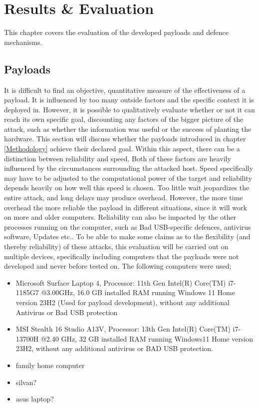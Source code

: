 \chapter{Results \& Evaluation} \label{Evaluation}

This chapter covers the evaluation of the developed payloads and defence mechanisms. 


\section{Payloads}

It is difficult to find an objective, quantitative measure of the effectiveness of a payload. It is influenced by too many outside factors and the specific context it is deployed in. However, it is possible to qualitatively evaluate whether or not it can reach its own specific goal, discounting any factors of the bigger picture of the attack, such as whether the information was useful or the success of planting the hardware. This section will discuss whether the payloads introduced in chapter \ref{Methodology} achieve their declared goal. Within this aspect, there can be a distinction between reliability and speed. Both of these factors are heavily influenced by the circumstances surrounding the attacked host. Speed specifically may have to be adjusted to the computational power of the target and reliability depends heavily on how well this speed is chosen. Too little wait jeopardizes the entire attack, and long delays may produce overhead. However, the more time overhead the more reliable the payload in different situations, since it will work on more and older computers. Reliability can also be impacted by the other processes running on the computer, such as Bad USB-specific defences, antivirus software, Updates etc.. To be able to make some claims as to the flexibility (and thereby reliability) of these attacks, this evaluation will be carried out on multiple devices, specifically including computers that the payloads were not developed and never before tested on. The following computers were used;

\begin{itemize}
    \item Microsoft Surface Laptop 4, Processor: 11th Gen Intel(R) Core(TM) i7-1185G7 @3.00GHz, 16.0 GB installed RAM running Windows 11 Home version 23H2 (Used for payload development), without any additional Antivirus or Bad USB protection
    \item MSI Stealth 16 Studio A13V, Processor: 13th Gen Intel(R) Core(TM) i7-13700H @2.40 GHz, 32 GB installed RAM running Windows11 Home version 23H2, without any additional antivirus or BAD USB protection.
    \item family home computer
    \item silvan?
    \item asus laptop?
\end{itemize}
    

